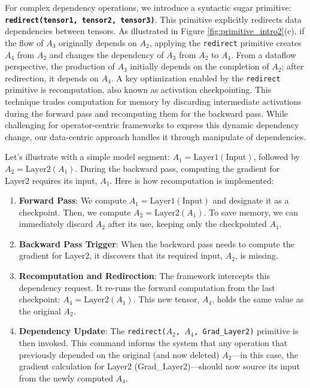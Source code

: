 \documentclass[letterpaper,twocolumn,10pt]{article}
\begin{document}
For complex dependency operations, we introduce a syntactic sugar primitive: \textbf{\texttt{redirect(tensor1, tensor2, tensor3)}}. This primitive explicitly redirects data dependencies between tensors. As illustrated in Figure \ref{fig:primitive_intro2}(c), if the flow of $A_3$ originally depends on $A_2$, applying the \texttt{redirect} primitive creates $A_4$ from $A_2$ and changes the dependency of $A_3$ from $A_2$ to $A_4$. From a dataflow perspective, the production of $A_3$ initially depends on the completion of $A_2$; after redirection, it depends on $A_4$. A key optimization enabled by the \texttt{redirect} primitive is recomputation, also known as activation checkpointing. This technique trades computation for memory by discarding intermediate activations during the forward pass and recomputing them for the backward pass. While challenging for operator-centric frameworks to express this dynamic dependency change, our data-centric approach handles it through manipulate of dependencies. 

Let's illustrate with a simple model segment: $A_1 = \text{Layer1}(\text{Input})$, followed by $A_2 = \text{Layer2}(A_1)$. During the backward pass, computing the gradient for Layer2 requires its input, $A_1$. Here is how recomputation is implemented:
\begin{enumerate}
    \item \textbf{Forward Pass}: We compute $A_1 = \text{Layer1}(\text{Input})$ and designate it as a checkpoint. Then, we compute $A_2 = \text{Layer2}(A_1)$. To save memory, we can immediately discard $A_2$ after its use, keeping only the checkpointed $A_1$.
    \item \textbf{Backward Pass Trigger}: When the backward pass needs to compute the gradient for Layer2, it discovers that its required input, $A_2$, is missing.
    \item \textbf{Recomputation and Redirection}: The framework intercepts this dependency request. It re-runs the forward computation from the last checkpoint: $A_4 = \text{Layer2}(A_1)$. This new tensor, $A_4$, holds the same value as the original $A_2$.
    \item \textbf{Dependency Update}: The \texttt{redirect($A_2$, $A_4$, Grad\_Layer2)} primitive is then invoked. This command informs the system that any operation that previously depended on the original (and now deleted) $A_2$—in this case, the gradient calculation for Layer2 (Grad\_Layer2)—should now source its input from the newly computed $A_4$.
\end{enumerate}
\end{document}
